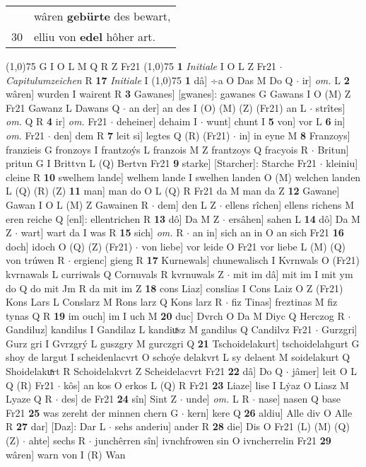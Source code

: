 \documentclass[8pt,a4paper,notitlepage]{article}
\begin{document}
\begin{table}[ht]
\begin{minipage}[t]{0.5\linewidth}
\begin{tabular}{rl}
 & wâren \textbf{gebürte} des bewart,\\ 
30 & elliu von \textbf{edel} hôher art.\\ 
\end{tabular}
\scriptsize
\line(1,0){75} \newline
G I O L M Q R Z Fr21 \newline
\line(1,0){75} \newline
\textbf{1} \textit{Initiale} I O L Z Fr21   $\cdot$ \textit{Capitulumzeichen} R  \textbf{17} \textit{Initiale} I  \newline
\line(1,0){75} \newline
\textbf{1} dâ] ÷a O Das M Do Q  $\cdot$ ir] \textit{om.} L \textbf{2} wâren] wurden I wairent R \textbf{3} Gawanes] [gwanes]: gawanes G Gawans I O (M) Z Fr21 Gawanz L Dawans Q  $\cdot$ an der] an des I (O) (M) (Z) (Fr21) an L  $\cdot$ strîtes] \textit{om.} Q R \textbf{4} ir] \textit{om.} Fr21  $\cdot$ deheiner] dehaim I  $\cdot$ wunt] chunt I \textbf{5} von] vor L \textbf{6} in] \textit{om.} Fr21  $\cdot$ den] dem R \textbf{7} leit si] legtes Q (R) (Fr21)  $\cdot$ in] in eyne M \textbf{8} Franzoys] franzieis G fronzoys I frantzoýs L franzois M Z frantzoys Q fracyois R  $\cdot$ Britun] pritun G I Brittvn L (Q) Bertvn Fr21 \textbf{9} starke] [Starcher]: Starche Fr21  $\cdot$ kleiniu] cleine R \textbf{10} swelhem lande] welhem lande I swelhen landen O (M) welchen landen L (Q) (R) (Z) \textbf{11} man] man do O L (Q) R Fr21 da M man da Z \textbf{12} Gawane] Gawan I O L (M) Z Gawainen R  $\cdot$ dem] den L Z  $\cdot$ ellens rîchen] ellens richens M eren reiche Q [enl]: ellentrichen R \textbf{13} dô] Da M Z  $\cdot$ ersâhen] sahen L \textbf{14} dô] Da M Z  $\cdot$ wart] wart da I was R \textbf{15} sich] \textit{om.} R  $\cdot$ an in] sich an in O an sich Fr21 \textbf{16} doch] idoch O (Q) (Z) (Fr21)  $\cdot$ von liebe] vor leide O Fr21 vor liebe L (M) (Q) von trúwen R  $\cdot$ ergienc] gieng R \textbf{17} Kurnewals] chunewalisch I Kvrnwals O (Fr21) kvrnawals L curriwals Q Cornuvals R kvrnuwals Z  $\cdot$ mit im dâ] mit im I mit ym do Q do mit Jm R da mit im Z \textbf{18} cons Liaz] conslias I Cons Laiz O Z (Fr21) Kons Lars L Conslarz M Rons larz Q Kons larz R  $\cdot$ fiz Tinas] freztinas M fiz tynas Q R \textbf{19} im ouch] im I uch M \textbf{20} duc] Dvrch O Da M Diyc Q Herczog R  $\cdot$ Gandiluz] kandilus I Gandilaz L kandiuͯsz M gandilus Q Candilvz Fr21  $\cdot$ Gurzgri] Gurz gri I Gvrzgrý L guszgry M gurczgri Q \textbf{21} Tschoidelakurt] tschoidelahgurt G shoy de largut I scheidenlacvrt O schoýe delakvrt L sy delaent M soidelakurt Q Shoidelakuͯrt R Schoidelakvrt Z Scheidelacvrt Fr21 \textbf{22} dâ] Do Q  $\cdot$ jâmer] leit O L Q (R) Fr21  $\cdot$ kôs] an kos O erkos L (Q) R Fr21 \textbf{23} Liaze] lise I Lẏaz O Liasz M Lyaze Q R  $\cdot$ des] de Fr21 \textbf{24} sîn] Sint Z  $\cdot$ unde] \textit{om.} L R  $\cdot$ nase] nasen Q base Fr21 \textbf{25} was zereht der minnen chern G  $\cdot$ kern] kere Q \textbf{26} aldiu] Alle div O Alle R \textbf{27} dar] [Daz]: Dar L  $\cdot$ sehs anderiu] ander R \textbf{28} die] Dis O Fr21 (L) (M) (Q) (Z)  $\cdot$ ahte] sechs R  $\cdot$ junchêrren sîn] ivnchfrowen sin O ivncherrelin Fr21 \textbf{29} wâren] warn von I (R) Wan 
\end{minipage}
\end{table}
\end{document}
